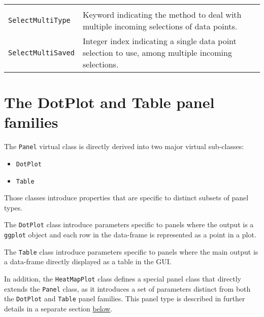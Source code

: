 \documentclass[]{book}
\providecommand{\tightlist}{%
  \setlength{\itemsep}{0pt}\setlength{\parskip}{0pt}}
\begin{document}
\begin{longtable}[]{@{}ll@{}}
\begin{minipage}[t]{0.47\columnwidth}
\end{minipage}\tabularnewline
\begin{minipage}[t]{0.47\columnwidth}\raggedright
\texttt{SelectMultiType}\strut
\end{minipage} & \begin{minipage}[t]{0.47\columnwidth}\raggedright
Keyword indicating the method to deal with multiple incoming selections of data points.\strut
\end{minipage}\tabularnewline
\begin{minipage}[t]{0.47\columnwidth}\raggedright
\texttt{SelectMultiSaved}\strut
\end{minipage} & \begin{minipage}[t]{0.47\columnwidth}\raggedright
Integer index indicating a single data point selection to use, among multiple incoming selections.\strut
\end{minipage}\tabularnewline
\bottomrule
\end{longtable}

\hypertarget{the-dotplot-and-table-panel-families}{%
\section{The DotPlot and Table panel families}\label{the-dotplot-and-table-panel-families}}

The \texttt{Panel} virtual class is directly derived into two major virtual sub-classes:

\begin{itemize}
\tightlist
\item
  \texttt{DotPlot}
\item
  \texttt{Table}
\end{itemize}

Those classes introduce properties that are specific to distinct subsets of panel types.

The \texttt{DotPlot} class introduce parameters specific to panels where the output is a \texttt{ggplot} object and each row in the data-frame is represented as a point in a plot.

The \texttt{Table} class introduce parameters specific to panels where the main output is a data-frame directly displayed as a table in the GUI.

In addition, the \texttt{HeatMapPlot} class defines a special panel class that directly extends the \texttt{Panel} class, as it introduces a set of parameters distinct from both the \texttt{DotPlot} and \texttt{Table} panel families.
This panel type is described in further details in a separate section \protect\hyperlink{heatmapplot-class}{below}.
\end{document}
